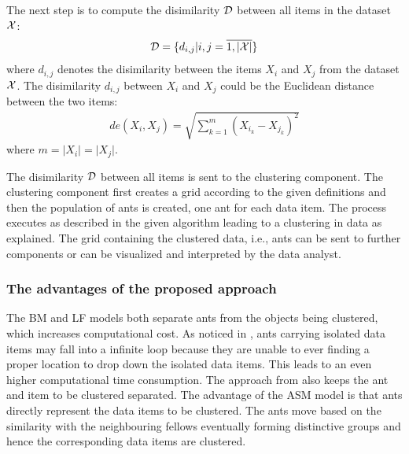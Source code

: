 The next step is to compute the disimilarity $\mathcal D$ between all items in the dataset $\mathcal X$:
\begin{align}
\mathcal D = \{d_{i,j} \vert i,j = \overline{1,\lvert \mathcal X \rvert}\}
\end{align}
where $d_{i,j}$ denotes the disimilarity between the items $X_i$ and $X_j$ from the dataset $\mathcal X$. The disimilarity $d_{i,j}$ between $X_i$ and $X_j$  could be the Euclidean distance between the two items:
\begin{align}
de (X_i, X_j) = \sqrt{\sum_{k=1}^{m}{(X_{i_k} - X_{j_k})^2} }
\end{align}
where $m = \lvert X_i \rvert = \lvert X_j \rvert$.

The disimilarity $\mathcal D$ between all items is sent to the clustering component. The clustering component first creates a grid according to the given definitions and then the population of ants is created, one ant for each data item. The process executes as described in the given algorithm leading to a clustering in data as explained. The grid containing the clustered data, i.e., ants can be sent to further components or can be visualized and interpreted by the data analyst.


\subsubsection{The advantages of the proposed approach}

The BM \cite{Deneubourg91TheDynamic} and LF \cite{Lumer94Diversity} models both separate ants from the objects being clustered, which increases computational cost. As noticed in \cite{Chen04AnAdaptive}, ants carrying isolated data items may fall into a infinite loop because they are unable to ever finding a proper location to drop down the isolated data items. This leads to an even higher computational time  consumption. The approach from \cite{Schockaert04Fuzzy} also keeps the ant and item to be clustered separated. The advantage of the ASM model is that ants directly represent the data items to be clustered. The ants move based on the similarity with the neighbouring fellows eventually forming distinctive groups and hence the corresponding data items are clustered. 
	
